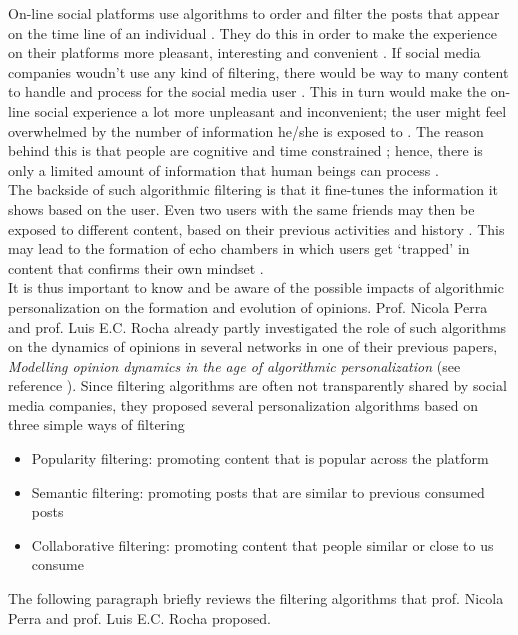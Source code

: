 \documentclass[11 pt , letterpaper , twoside , openright]{book}
\begin{document}
On-line social platforms use algorithms to order and filter the posts that appear on the time line of an individual \cite{Perra2019}. They do this in order to make the experience on their platforms more pleasant, interesting and convenient \cite{Perra2019}. If social media companies woudn't use any kind of filtering, there would be way to many content to handle and process for the social media user \cite{Bozdag2013}. This in turn would make the on-line social experience a lot more unpleasant and inconvenient; the user might feel overwhelmed by the number of information he/she is exposed to \cite{Bozdag2013}. The reason behind this is that people are cognitive and time constrained \cite{Perra2019}; hence, there is only a limited amount of information that human beings can process \cite{Bozdag2013}.\\
\newline
The backside of such algorithmic filtering is that it fine-tunes the information it shows based on the user. Even two users with the same friends may then be exposed to different content, based on their previous activities and history \cite{Bozdag2013}. This may lead to the formation of echo chambers in which users get `trapped' in content that confirms their own mindset \cite{Bozdag2013}. \\
It is thus important to know and be aware of the possible impacts of algorithmic personalization on the formation and evolution of opinions. Prof. Nicola Perra and prof. Luis E.C. Rocha already partly investigated the role of such algorithms on the dynamics of opinions in several networks in one of their previous papers, \textit{Modelling opinion dynamics in the age of algorithmic personalization} (see reference \cite{Perra2019}). Since filtering algorithms are often not transparently shared by social media companies, they proposed several personalization algorithms based on three simple ways of filtering \cite{Perra2019}
\begin{itemize}
	\item Popularity filtering: promoting content that is popular across the platform
	\item Semantic filtering: promoting posts that are similar to previous consumed posts
	\item Collaborative filtering: promoting content that people similar or close to us consume
\end{itemize} 
The following paragraph briefly reviews the filtering algorithms that prof. Nicola Perra and prof. Luis E.C. Rocha proposed. \\
\end{document}
